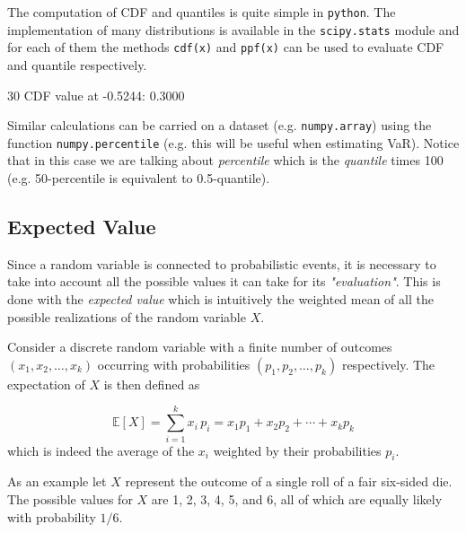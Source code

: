 The computation of CDF and quantiles is quite simple in \texttt{python}. The implementation of many distributions is available in the \texttt{scipy.stats} module and for each of them the methods \texttt{cdf(x)} and \texttt{ppf(x)} can be used to evaluate CDF and quantile respectively.


\begin{ioutput}
30%
CDF value at -0.5244: 0.3000
\end{ioutput}

Similar calculations can be carried on a dataset (e.g. \texttt{numpy.array}) using the function \texttt{numpy.percentile} (e.g. this will be useful when estimating VaR). Notice that in this case we are talking about \emph{percentile} which is the \emph{quantile} times 100 (e.g. 50-percentile is equivalent to 0.5-quantile).


\begin{ioutput}
[1.08 5.  ]
\end{ioutput}

\subsection{Expected Value}\label{sec:expected-value}

Since a random variable is connected to probabilistic events, it is necessary to take into account all the possible values it can take for its \textit{"evaluation"}. This is done with the \emph{expected value} which is intuitively the weighted mean of all the possible realizations of the random variable $X$.

Consider a discrete random variable with a finite number of outcomes $(x_{1},x_{2},\ldots ,x_{k})$ occurring with probabilities $(p_{1},p_{2},\ldots ,p_{k})$ respectively. The expectation of $X$ is then defined as

\begin{equation}
\mathbb{E}[X]=\sum _{i=1}^{k}x_{i}\,p_{i}=x_{1}p_{1}+x_{2}p_{2}+\cdots +x_{k}p_{k}
\end{equation}
which is indeed the average of the $x_{i}$ weighted by their probabilities $p_{i}$.

As an example let $X$ represent the outcome of a single roll of a fair six-sided die. The possible values for $X$ are 1, 2, 3, 4, 5, and 6, all of which are equally likely with probability $1/6$.

